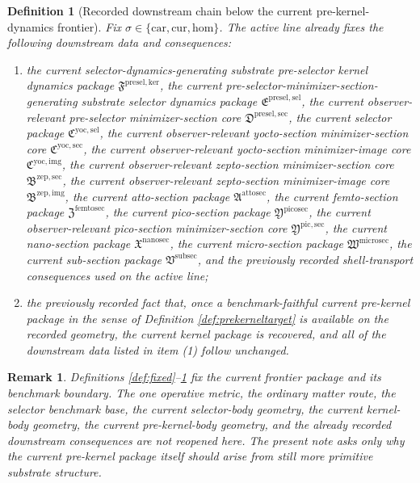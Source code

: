 \documentclass[11pt]{article}
\newcommand{\Car}{\mathrm{car}}
\newcommand{\Cur}{\mathrm{cur}}
\newcommand{\Hom}{\mathrm{hom}}
\newcommand{\SubSectionPackage}{\mathfrak V^{\mathrm{subsec}}}
\newcommand{\MicroSectionPackage}{\mathfrak W^{\mathrm{microsec}}}
\newcommand{\NanoSectionPackage}{\mathfrak X^{\mathrm{nanosec}}}
\newcommand{\PicoSectionPackage}{\mathfrak Y^{\mathrm{picosec}}}
\newcommand{\PicoMinSectionCore}{\mathfrak Y^{\mathrm{pic,sec}}}
\newcommand{\FemtoSectionPackage}{\mathfrak Z^{\mathrm{femtosec}}}
\newcommand{\AttoSectionPackage}{\mathfrak A^{\mathrm{attosec}}}
\newcommand{\ZeptoImageCore}{\mathfrak B^{\mathrm{zep,img}}}
\newcommand{\ZeptoMinSectionCore}{\mathfrak B^{\mathrm{zep,sec}}}
\newcommand{\YoctoImageCore}{\mathfrak C^{\mathrm{yoc,img}}}
\newcommand{\YoctoMinSectionCore}{\mathfrak C^{\mathrm{yoc,sec}}}
\newcommand{\YoctoSelectorPackage}{\mathfrak C^{\mathrm{yoc,sel}}}
\newcommand{\PreSelectorMinSectionCore}{\mathfrak D^{\mathrm{presel,sec}}}
\newcommand{\PreSectionSelectorPackage}{\mathfrak E^{\mathrm{presel,sel}}}
\newcommand{\KernelPackage}{\mathfrak F^{\mathrm{presel,ker}}}
\newtheorem{definition}{Definition}
\newtheorem{remark}{Remark}
\begin{document}
\begin{definition}[Recorded downstream chain below the current pre-kernel-dynamics frontier]
\label{def:downstream}
Fix \(\sigma\in\{\Car,\Cur,\Hom\}\). The active line already fixes the following downstream data and consequences:
\begin{enumerate}
    \item the current selector-dynamics-generating substrate pre-selector kernel dynamics package \(\KernelPackage\), the current pre-selector-minimizer-section-generating substrate selector dynamics package \(\PreSectionSelectorPackage\), the current observer-relevant pre-selector minimizer-section core \(\PreSelectorMinSectionCore\), the current selector package \(\YoctoSelectorPackage\), the current observer-relevant yocto-section minimizer-section core \(\YoctoMinSectionCore\), the current observer-relevant yocto-section minimizer-image core \(\YoctoImageCore\), the current observer-relevant zepto-section minimizer-section core \(\ZeptoMinSectionCore\), the current observer-relevant zepto-section minimizer-image core \(\ZeptoImageCore\), the current atto-section package \(\AttoSectionPackage\), the current femto-section package \(\FemtoSectionPackage\), the current pico-section package \(\PicoSectionPackage\), the current observer-relevant pico-section minimizer-section core \(\PicoMinSectionCore\), the current nano-section package \(\NanoSectionPackage\), the current micro-section package \(\MicroSectionPackage\), the current sub-section package \(\SubSectionPackage\), and the previously recorded shell-transport consequences used on the active line;
    \item the previously recorded fact that, once a benchmark-faithful current pre-kernel package in the sense of Definition \ref{def:prekerneltarget} is available on the recorded geometry, the current kernel package is recovered, and all of the downstream data listed in item (1) follow unchanged.
\end{enumerate}
\end{definition}

\begin{remark}
Definitions \ref{def:fixed}--\ref{def:downstream} fix the current frontier package and its benchmark boundary. The one operative metric, the ordinary matter route, the selector benchmark base, the current selector-body geometry, the current kernel-body geometry, the current pre-kernel-body geometry, and the already recorded downstream consequences are not reopened here. The present note asks only why the current pre-kernel package itself should arise from still more primitive substrate structure.
\end{remark}
\end{document}
